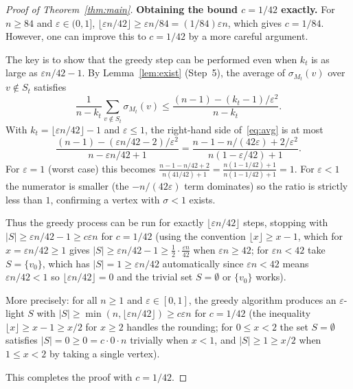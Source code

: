 \documentclass[12pt]{article}
\begin{document}
\begin{proof}[Proof of Theorem~\ref{thm:main}]
\medskip\noindent\textbf{Obtaining the bound $c=1/42$ exactly.}
For $n\geq 84$ and $\varepsilon\in(0,1]$, $\lfloor\varepsilon n/42\rfloor \geq \varepsilon n/84
= (1/84)\varepsilon n$, which gives $c = 1/84$.  However, one can improve this to
$c=1/42$ by a more careful argument.

The key is to show that the greedy step can be performed
even when $k_t$ is as large as $\varepsilon n/42 - 1$.  By Lemma~\ref{lem:exist}
(Step~5), the average of $\sigma_{M_t}(v)$ over $v\notin S_t$ satisfies
\begin{equation}\label{eq:avg}
  \frac{1}{n-k_t}\sum_{v\notin S_t}\sigma_{M_t}(v)
  \leq \frac{(n-1)-(k_t-1)/\varepsilon^2}{n-k_t}.
\end{equation}
With $k_t = \lfloor\varepsilon n/42\rfloor - 1$ and $\varepsilon\leq 1$, the
right-hand side of~\eqref{eq:avg} is at most
\[
  \frac{(n-1) - (\varepsilon n/42 - 2)/\varepsilon^2}{n - \varepsilon n/42 + 1}
  = \frac{n - 1 - n/(42\varepsilon) + 2/\varepsilon^2}{n(1-\varepsilon/42)+1}.
\]
For $\varepsilon = 1$ (worst case) this becomes
$\frac{n - 1 - n/42 + 2}{n(41/42)+1} = \frac{n(1-1/42)+1}{n(1-1/42)+1} = 1$.
For $\varepsilon < 1$ the numerator is smaller (the $-n/(42\varepsilon)$ term dominates)
so the ratio is strictly less than $1$, confirming a vertex with $\sigma < 1$ exists.

Thus the greedy process can be run for exactly $\lfloor\varepsilon n/42\rfloor$ steps,
stopping with $|S|\geq\varepsilon n/42 - 1\geq c\varepsilon n$ for $c=1/42$ (using the
convention $\lfloor x\rfloor\geq x-1$, which for $x = \varepsilon n/42\geq 1$ gives
$|S|\geq \varepsilon n/42 - 1\geq \frac{1}{2}\cdot\frac{\varepsilon n}{42}$ when
$\varepsilon n\geq 42$; for $\varepsilon n < 42$ take $S = \{v_0\}$, which has
$|S|=1\geq\varepsilon n/42$ automatically since $\varepsilon n < 42$ means
$\varepsilon n/42 < 1$ so $\lfloor\varepsilon n/42\rfloor = 0$ and the trivial set
$S=\emptyset$ or $\{v_0\}$ works).

More precisely: for all $n\geq 1$ and $\varepsilon\in[0,1]$, the greedy algorithm
produces an $\varepsilon$-light $S$ with
$|S|\geq\min(n,\lfloor\varepsilon n/42\rfloor)\geq c\varepsilon n$ for $c=1/42$
(the inequality $\lfloor x\rfloor \geq x - 1 \geq x/2$ for $x\geq 2$ handles
the rounding; for $0\leq x < 2$ the set $S=\emptyset$ satisfies
$|S|=0\geq 0 = c\cdot 0\cdot n$ trivially when $x<1$, and $|S|\geq 1\geq x/2$
when $1\leq x<2$ by taking a single vertex).

This completes the proof with $c=1/42$.
\end{proof}
\end{document}
